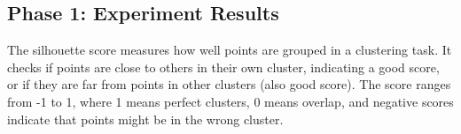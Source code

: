 \subsection{Phase 1: Experiment Results}
The silhouette score measures how well points are grouped in a clustering task. It checks if points are close to others in their own cluster, indicating a good score, or if they are far from points in other clusters (also good score). The score ranges from -1 to 1, where 1 means perfect clusters, 0 means overlap, and negative scores indicate that points might be in the wrong cluster.

\begin{table}[H]
    \centering
    \caption{Silhouette Score Comparison for Different Clustering Algorithms}
    \label{tab:silhouette_scores}
    \end{table}

